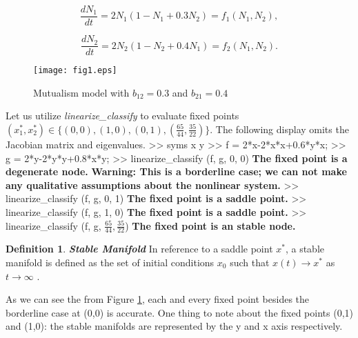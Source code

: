 \documentclass[11pt,a4paper]{scrartcl}
\theoremstyle{definition}
\newtheorem*{definition}{Definition}
\begin{document}
\begin{equation} \label{eq22}
	\frac{dN_1}{dt}=2N_1(1-N_1+0.3N_2)=f_1(N_1, N_2),
\end{equation}

\begin{equation} \label{eq23}
	\frac{dN_2}{dt}=2N_2(1-N_2+0.4N_1)=f_2(N_1, N_2).
\end{equation}

\begin{figure}[!ht]
\centering
\texttt{[image: fig1.eps]}
\centering
\caption{Mutualism model with  $b_{12} = 0.3$ and $b_{21} = 0.4$}
\label{figM1}
\end{figure}

 Let us utilize \textit{linearize\_classify} to evaluate fixed points $(x_1^{*}, x_2^{*}) \in \Big\{(0,0), (1,0), (0,1), (\frac{65}{44}, \frac{35}{22}) \Big\}$. The following display omits the Jacobian matrix and eigenvalues.
\newline
>> syms x y\newline
>> f = 2*x-2*x*x+0.6*y*x;\newline
>> g = 2*y-2*y*y+0.8*x*y;\newline
>> linearize\_classify (f, g, 0, 0)\newline
\textbf{The fixed point is a degenerate node.}\newline
\textbf{Warning: This is a borderline case; we can not make any qualitative assumptions about the nonlinear system.}\newline
>> linearize\_classify (f, g, 0, 1)\newline
\textbf{The fixed point is a saddle point.}\newline
>> linearize\_classify (f, g, 1, 0)\newline
\textbf{The fixed point is a saddle point.}\newline
>> linearize\_classify (f, g, $\frac{65}{44}, \frac{35}{22}$)\newline
\textbf{The fixed point is an stable node.}\newline

\begin{definition}{\textbf{\textit{Stable Manifold}}}
\newline
In reference to a saddle point $x^*$, a stable manifold is defined as the set of initial conditions $x_0$ such that $x(t) \rightarrow x^{*}$ as $
t \rightarrow \infty$ \cite{main}.
\end{definition}

As we can see the from Figure \ref{figM1}, each and every fixed point besides the borderline case at (0,0) is accurate. One thing to note about the fixed points (0,1) and (1,0): the stable manifolds are represented by the y and x axis respectively.\newline
\end{document}

